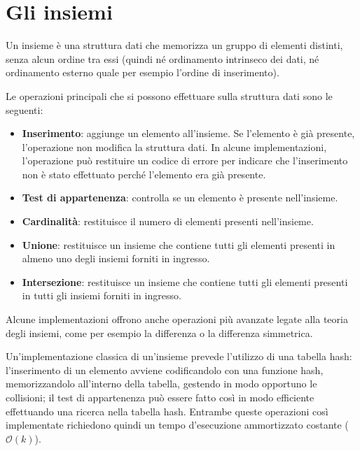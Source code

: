 \section{Gli insiemi}

Un insieme è una struttura dati che memorizza un gruppo di elementi distinti, senza alcun ordine tra
essi (quindi né ordinamento intrinseco dei dati, né ordinamento esterno quale per esempio l'ordine
di inserimento).

Le operazioni principali che si possono effettuare sulla struttura dati sono le seguenti:

\begin{itemize}
	\medskip

	\item
	\textbf{Inserimento}: aggiunge un elemento all'insieme. Se l'elemento è già presente,
	l'operazione non modifica la struttura dati. In alcune implementazioni, l'operazione può 
	restituire un codice di errore per indicare che l'inserimento non è stato effettuato
	perché l'elemento era già presente.

	\item
	\textbf{Test di appartenenza}: controlla se un elemento è presente nell'insieme.

	\item
	\textbf{Cardinalità}: restituisce il numero di elementi presenti nell'insieme.

	\item
	\textbf{Unione}: restituisce un insieme che contiene tutti gli elementi presenti in almeno uno
	degli insiemi forniti in ingresso.

	\item
	\textbf{Intersezione}: restituisce un insieme che contiene tutti gli elementi presenti in tutti
	gli insiemi forniti in ingresso.
\end{itemize}

Alcune implementazioni offrono anche operazioni più avanzate legate alla teoria degli insiemi,
come per esempio la differenza o la differenza simmetrica. 

Un'implementazione classica di un'insieme prevede l'utilizzo di una tabella hash: l'inserimento
di un elemento avviene codificandolo con una funzione hash, memorizzandolo all'interno della
tabella, gestendo in modo opportuno le collisioni; il test di appartenenza può essere fatto così in
modo efficiente effettuando una ricerca nella tabella hash. Entrambe queste operazioni così 
implementate richiedono quindi un tempo d'esecuzione ammortizzato costante ($\mathcal{O}(k)$).

